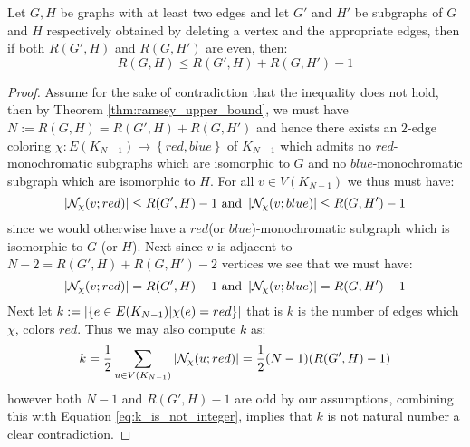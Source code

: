 \begin{corollary}\label{cor:upper_bounds_from_ramseys_theorem_even}
	Let $G, H$ be graphs with at least two edges and let $G'$ and $H'$ be subgraphs of $G$ and $H$ respectively obtained by deleting a vertex and the appropriate edges, then if both $R(G', H)$ and $R(G, H')$ are even, then:
	\begin{equation*}
		R(G, H) \leq R(G', H) + R(G, H') - 1
	\end{equation*}
\end{corollary}
\begin{proof}
	Assume for the sake of contradiction that the inequality does not hold, then by Theorem \ref{thm:ramsey_upper_bound}, we must have $N := R(G, H) = R(G', H) + R(G, H')$ and hence there exists an $2$-edge coloring $\chi: E(K_{N - 1}) \to \left\{red, blue\right\}$ of $K_{N - 1}$ which admits no $red$-monochromatic subgraphs which are isomorphic to $G$ and no $blue$-monochromatic subgraph which are isomorphic to $H$. For all $v \in V(K_{N - 1})$ we thus must have:
	\begin{equation*}
		\left\lvert\mathcal{N}_{\chi}(v; red)\right\rvert \leq R(G', H) - 1 \text{ and } \left\lvert\mathcal{N}_{\chi}(v; blue)\right\rvert \leq R(G, H') - 1
	\end{equation*}
	since we would otherwise have a $red$(or $blue$)-monochromatic subgraph which is isomorphic to $G$ (or $H$). Next since $v$ is adjacent to $N - 2 = R(G', H) + R(G, H') - 2$ vertices we see that we must have:
	\begin{equation*}
		\left\lvert\mathcal{N}_{\chi}(v; red)\right\rvert = R(G', H) - 1 \text{ and } \left\lvert\mathcal{N}_{\chi}(v; blue)\right\rvert = R(G, H') - 1
	\end{equation*}
	Next let $k := \left\lvert\left\{e \in E(K_{N - 1}) | \chi(e) = red\right\}\right\rvert$ that is $k$ is the number of edges which $\chi$, colors $red$. Thus we may also compute $k$ as:
	\begin{equation}\label{eq:k_is_not_integer}
		k = \frac{1}{2}\sum_{u \in V(K_{N - 1})}\left\lvert\mathcal{N}_{\chi}(u; red)\right\rvert = \frac{1}{2}(N - 1)(R(G', H) - 1)
	\end{equation}
	however both $N-1$ and $R(G', H) - 1$ are odd by our assumptions, combining this with Equation \eqref{eq:k_is_not_integer}, implies that $k$ is not natural number a clear contradiction.
\end{proof}
